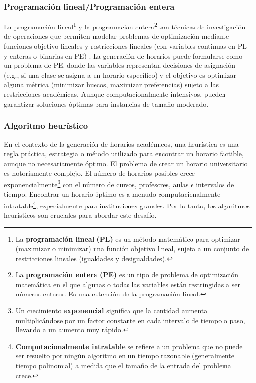 \subsubsection{Programación lineal/Programación entera}
La programación lineal\footnote{La \textbf{programación lineal (PL)} es un método matemático para optimizar (maximizar o minimizar) una función objetivo lineal, sujeta a un conjunto de restricciones lineales (igualdades y desigualdades).} y la programación entera\footnote{La \textbf{programación entera (PE)} es un tipo de problema de optimización matemática en el que algunas o todas las variables están restringidas a ser números enteros.
Es una extensión de la programación lineal.} son técnicas de investigación de operaciones que permiten modelar problemas de optimización mediante funciones objetivo lineales y restricciones lineales (con variables continuas en PL y enteras o binarias en PE) \parencite{Winston2004}.
La generación de horarios puede formularse como un problema de PE, donde las variables representan decisiones de asignación (e.g., si una clase se asigna a un horario específico) y el objetivo es optimizar alguna métrica (minimizar huecos, maximizar preferencias) sujeto a las restricciones académicas.
Aunque computacionalmente intensivos, pueden garantizar soluciones óptimas para instancias de tamaño moderado.

\subsubsection{Algoritmo heurístico}

En el contexto de la generación de horarios académicos, una heurística es una regla práctica, estrategia o método utilizado para encontrar un horario factible, aunque no necesariamente óptimo.
El problema de crear un horario universitario es notoriamente complejo.
El número de horarios posibles crece exponencialmente\footnote{Un crecimiento \textbf{exponencial} significa que la cantidad aumenta multiplicándose por un factor constante en cada intervalo de tiempo o paso, llevando a un aumento muy rápido.} con el número de cursos, profesores, aulas e intervalos de tiempo.
Encontrar un horario óptimo es a menudo computacionalmente intratable\footnote{\textbf{Computacionalmente intratable} se refiere a un problema que no puede ser resuelto por ningún algoritmo en un tiempo razonable (generalmente tiempo polinomial) a medida que el tamaño de la entrada del problema crece.}, especialmente para instituciones grandes.
Por lo tanto, los algoritmos heurísticos son cruciales para abordar este desafío.

